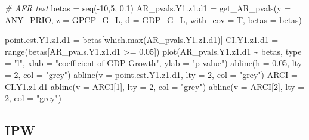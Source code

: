 \documentclass[
]{article}
\newenvironment{Shaded}{\begin{snugshade}}{\end{snugshade}}
\newcommand{\AttributeTok}[1]{\textcolor[rgb]{0.77,0.63,0.00}{#1}}
\newcommand{\CommentTok}[1]{\textcolor[rgb]{0.56,0.35,0.01}{\textit{#1}}}
\newcommand{\DecValTok}[1]{\textcolor[rgb]{0.00,0.00,0.81}{#1}}
\newcommand{\FloatTok}[1]{\textcolor[rgb]{0.00,0.00,0.81}{#1}}
\newcommand{\FunctionTok}[1]{\textcolor[rgb]{0.00,0.00,0.00}{#1}}
\newcommand{\NormalTok}[1]{#1}
\newcommand{\OtherTok}[1]{\textcolor[rgb]{0.56,0.35,0.01}{#1}}
\newcommand{\SpecialCharTok}[1]{\textcolor[rgb]{0.00,0.00,0.00}{#1}}
\newcommand{\StringTok}[1]{\textcolor[rgb]{0.31,0.60,0.02}{#1}}
\begin{document}
\begin{Shaded}
\begin{Highlighting}[]
\CommentTok{\# AFR test}
\NormalTok{betas }\OtherTok{=} \FunctionTok{seq}\NormalTok{(}\SpecialCharTok{{-}}\DecValTok{10}\NormalTok{,}\DecValTok{5}\NormalTok{, }\FloatTok{0.1}\NormalTok{)}
\NormalTok{AR\_pvals.Y1.z1.d1 }\OtherTok{=} \FunctionTok{get\_AR\_pvals}\NormalTok{(}\AttributeTok{y =} \StringTok{\textquotesingle{}ANY\_PRIO\textquotesingle{}}\NormalTok{, }\AttributeTok{z  =} \StringTok{\textquotesingle{}GPCP\_G\_L\textquotesingle{}}\NormalTok{, }\AttributeTok{d =} \StringTok{\textquotesingle{}GDP\_G\_L\textquotesingle{}}\NormalTok{, }\AttributeTok{with\_cov =}\NormalTok{ T, }\AttributeTok{betas =}\NormalTok{ betas)}

\NormalTok{point.est.Y1.z1.d1 }\OtherTok{=}\NormalTok{  betas[}\FunctionTok{which.max}\NormalTok{(AR\_pvals.Y1.z1.d1)]}
\NormalTok{CI.Y1.z1.d1 }\OtherTok{=} \FunctionTok{range}\NormalTok{(betas[AR\_pvals.Y1.z1.d1 }\SpecialCharTok{\textgreater{}=} \FloatTok{0.05}\NormalTok{])}
\FunctionTok{plot}\NormalTok{(AR\_pvals.Y1.z1.d1 }\SpecialCharTok{\textasciitilde{}}\NormalTok{ betas, }\AttributeTok{type =} \StringTok{"l"}\NormalTok{,}
     \AttributeTok{xlab =} \StringTok{"coefficient of GDP Growth"}\NormalTok{,}
     \AttributeTok{ylab =} \StringTok{"p{-}value"}\NormalTok{)}
\FunctionTok{abline}\NormalTok{(}\AttributeTok{h =} \FloatTok{0.05}\NormalTok{, }\AttributeTok{lty =} \DecValTok{2}\NormalTok{, }\AttributeTok{col =} \StringTok{"grey"}\NormalTok{)}
\FunctionTok{abline}\NormalTok{(}\AttributeTok{v =}\NormalTok{ point.est.Y1.z1.d1, }\AttributeTok{lty =} \DecValTok{2}\NormalTok{, }\AttributeTok{col =} \StringTok{"grey"}\NormalTok{)}
\NormalTok{ARCI }\OtherTok{=}\NormalTok{ CI.Y1.z1.d1}
\FunctionTok{abline}\NormalTok{(}\AttributeTok{v =}\NormalTok{ ARCI[}\DecValTok{1}\NormalTok{], }\AttributeTok{lty =} \DecValTok{2}\NormalTok{, }\AttributeTok{col =} \StringTok{"grey"}\NormalTok{)}
\FunctionTok{abline}\NormalTok{(}\AttributeTok{v =}\NormalTok{ ARCI[}\DecValTok{2}\NormalTok{], }\AttributeTok{lty =} \DecValTok{2}\NormalTok{, }\AttributeTok{col =} \StringTok{"grey"}\NormalTok{)}
\end{Highlighting}
\end{Shaded}

\hypertarget{ipw}{%
\subsection{IPW}\label{ipw}}
\end{document}

